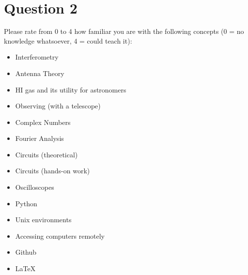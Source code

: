 \documentclass[10pt]{article}
\begin{document}
\section*{Question 2}
\vspace{-0.1in}
Please rate from 0 to 4 how familiar you are with the following concepts (0 = no knowledge whatsoever, 4 = could teach it):\\
\vspace{-0.2in}
\begin{itemize}
\item Interferometry \\
\vspace{-0.2in}
\item Antenna Theory \\
\vspace{-0.2in}
\item HI gas and its utility for astronomers \\
\vspace{-0.2in}
\item Observing (with a telescope) \\
\vspace{-0.2in}
\item Complex Numbers \\
\vspace{-0.2in}
\item Fourier Analysis \\
\vspace{-0.2in}
\item Circuits (theoretical) \\
\vspace{-0.2in}
\item Circuits (hands-on work) \\
\vspace{-0.2in}
\item Oscilloscopes \\
\vspace{-0.2in}
\item Python \\
\vspace{-0.2in}
\item Unix environments \\
\vspace{-0.2in}
\item Accessing computers remotely \\
\vspace{-0.2in}
\item Github \\
\vspace{-0.2in}
\item \LaTeX \\
\end{itemize}
\vspace{-0.2in}
\end{document}
